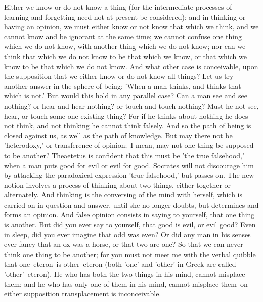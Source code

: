 Either we know or do not know a thing (for the intermediate processes
of learning and forgetting need not at present be considered); and in
thinking or having an opinion, we must either know or not know that
which we think, and we cannot know and be ignorant at the same time; we
cannot confuse one thing which we do not know, with another thing which
we do not know; nor can we think that which we do not know to be that
which we know, or that which we know to be that which we do not know.
And what other case is conceivable, upon the supposition that we either
know or do not know all things? Let us try another answer in the sphere
of being: 'When a man thinks, and thinks that which is not.' But would
this hold in any parallel case? Can a man see and see nothing? or hear
and hear nothing? or touch and touch nothing? Must he not see, hear, or
touch some one existing thing? For if he thinks about nothing he does
not think, and not thinking he cannot think falsely. And so the path of
being is closed against us, as well as the path of knowledge. But may
there not be 'heterodoxy,' or transference of opinion;--I mean, may not
one thing be supposed to be another? Theaetetus is confident that this
must be 'the true falsehood,' when a man puts good for evil or evil
for good. Socrates will not discourage him by attacking the paradoxical
expression 'true falsehood,' but passes on. The new notion involves a
process of thinking about two things, either together or alternately.
And thinking is the conversing of the mind with herself, which is
carried on in question and answer, until she no longer doubts, but
determines and forms an opinion. And false opinion consists in saying to
yourself, that one thing is another. But did you ever say to yourself,
that good is evil, or evil good? Even in sleep, did you ever imagine
that odd was even? Or did any man in his senses ever fancy that an ox
was a horse, or that two are one? So that we can never think one thing
to be another; for you must not meet me with the verbal quibble that
one--eteron--is other--eteron (both 'one' and 'other' in Greek are
called 'other'--eteron). He who has both the two things in his mind,
cannot misplace them; and he who has only one of them in his mind,
cannot misplace them--on either supposition transplacement is
inconceivable.

